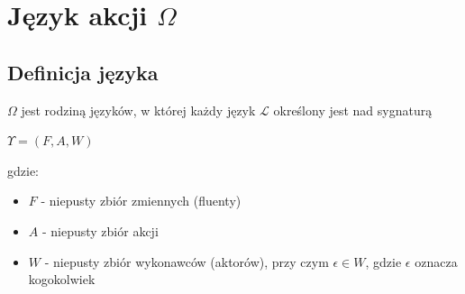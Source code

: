 \documentclass{article}
\begin{document}
\section{Język akcji $\Omega$}

\subsection{Definicja języka}
$\Omega$ jest rodziną języków, w której każdy język $\mathcal{L}$ określony jest nad sygnaturą 
\begin{center}
$\Upsilon=(F,A,W)$
\end{center}
gdzie: 
\begin{itemize}
\item $F$ - niepusty zbiór zmiennych (fluenty)
\item $A$ - niepusty zbiór akcji
\item $W$ - niepusty zbiór wykonawców (aktorów), przy czym $\epsilon\in W$, gdzie $\epsilon$ oznacza kogokolwiek
\end{itemize}
\end{document}

